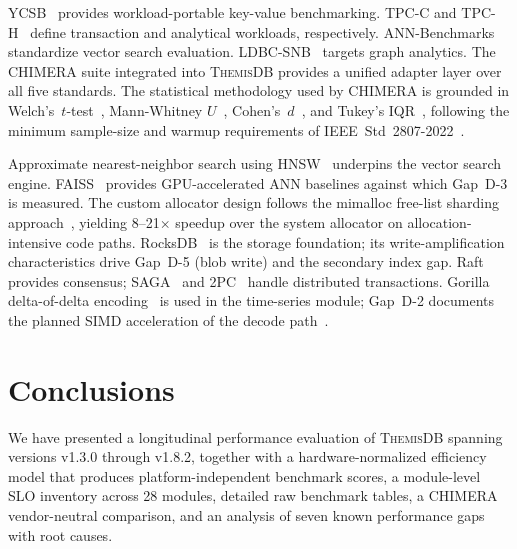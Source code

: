 \documentclass[conference]{IEEEtran}
\newcommand{\themis}{\textsc{ThemisDB}}
\begin{document}
YCSB~\cite{Cooper2010} provides workload-portable key-value
benchmarking.
TPC-C and TPC-H~\cite{TPCC,TPCH} define transaction and analytical
workloads, respectively.
ANN-Benchmarks~\cite{AnnBenchmarks} standardize vector search
evaluation.
LDBC-SNB~\cite{LDBCSNB} targets graph analytics.
The CHIMERA suite integrated into \themis{} provides a unified
adapter layer over all five standards.
The statistical methodology used by CHIMERA is grounded in
Welch's~$t$-test~\cite{Welch1947}, Mann-Whitney
$U$~\cite{Mann1947}, Cohen's~$d$~\cite{Cohen1988}, and
Tukey's IQR~\cite{Tukey1977}, following the minimum sample-size and
warmup requirements of IEEE~Std~2807-2022~\cite{IEEE2807}.

Approximate nearest-neighbor search using HNSW~\cite{Malkov2018}
underpins the vector search engine.
FAISS~\cite{Johnson2021} provides GPU-accelerated ANN baselines
against which Gap~D-3 is measured.
The custom allocator design follows the mimalloc free-list
sharding approach~\cite{Leijen2019}, yielding 8--21$\times$ speedup
over the system allocator on allocation-intensive code paths.
RocksDB~\cite{Dong2021} is the storage foundation; its
write-amplification characteristics drive Gap~D-5 (blob write)
and the secondary index gap.
Raft~\cite{Ongaro2014} provides consensus; SAGA~\cite{Garcia-Molina1987}
and 2PC~\cite{Gray1978} handle distributed transactions.
Gorilla delta-of-delta encoding~\cite{Pelkonen2015} is used in the
time-series module; Gap~D-2 documents the planned SIMD acceleration
of the decode path~\cite{Lemire2018}.

\section{Conclusions}
\label{sec:conclusion}

We have presented a longitudinal performance evaluation of \themis{}
spanning versions v1.3.0 through v1.8.2, together with a
hardware-normalized efficiency model that produces platform-independent
benchmark scores, a module-level SLO inventory across 28 modules,
detailed raw benchmark tables, a CHIMERA vendor-neutral comparison,
and an analysis of seven known performance gaps with root causes.
\end{document}
